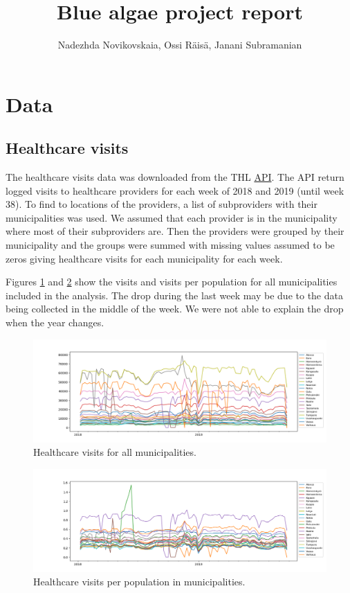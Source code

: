 \documentclass[a4paper, 12pt, english]{article}
\title{Blue algae project report}
\author{Nadezhda Novikovskaia, Ossi Räisä, Janani Subramanian}
\begin{document}
\maketitle

\section{Data}

\subsection{Healthcare visits}
The healthcare visits data was downloaded from
the THL
\href{https://sampo.thl.fi/pivot/prod/fi/avopika/pikarap01/fact_ahil_pikarap01.csv?row=palveluntuottaja-349235L&column=viikko-349531L}{API}.
The API return logged visits to healthcare providers for each week
of 2018 and 2019 (until week 38). To find to locations of the providers,
a list of subproviders with their municipalities was used. We assumed
that each provider is in the municipality where most of their
subproviders are. Then the providers were grouped by their municipality
and the groups were summed with missing values assumed to be zeros
giving healthcare visits for each municipality for each week.

Figures \ref{visits} and \ref{visitsperpop} show the
visits and visits per population for all municipalities included
in the analysis. The drop during the last week may be
due to the data being collected in the middle of the week.
We were not able to explain the drop when the year changes.

\begin{figure}[h]
\includegraphics[width=\textwidth]{visits}
\caption{
Healthcare visits for all municipalities.
}
\label{visits}
\end{figure}

\begin{figure}[h]
\includegraphics[width=\textwidth]{visitsperpop}
\caption{
Healthcare visits per population in municipalities.
}
\label{visitsperpop}
\end{figure}
\end{document}

